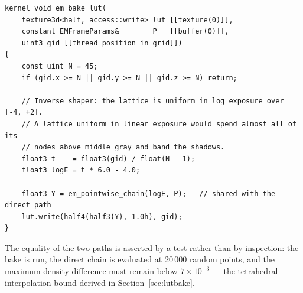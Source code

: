 \begin{lstlisting}[language=Metal, caption={LUT bake driver.}, label={lst:bake}]
kernel void em_bake_lut(
    texture3d<half, access::write> lut [[texture(0)]],
    constant EMFrameParams&        P   [[buffer(0)]],
    uint3 gid [[thread_position_in_grid]])
{
    const uint N = 45;
    if (gid.x >= N || gid.y >= N || gid.z >= N) return;

    // Inverse shaper: the lattice is uniform in log exposure over [-4, +2].
    // A lattice uniform in linear exposure would spend almost all of its
    // nodes above middle gray and band the shadows.
    float3 t    = float3(gid) / float(N - 1);
    float3 logE = t * 6.0 - 4.0;

    float3 Y = em_pointwise_chain(logE, P);   // shared with the direct path
    lut.write(half4(half3(Y), 1.0h), gid);
}
\end{lstlisting}

The equality of the two paths is asserted by a test rather than by inspection:
the bake is run, the direct chain is evaluated at 20\,000 random points, and the
maximum density difference must remain below $7\times10^{-3}$ --- the
tetrahedral interpolation bound derived in Section~\ref{sec:lutbake}.
